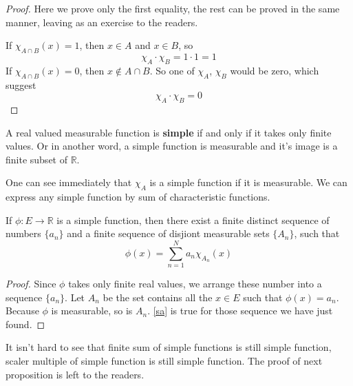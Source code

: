 \documentclass[lang=en, 12pt]{elegantbook}
\newcommand{\RR}{\mathbb{R}}
\begin{document}
                \begin{proof}
                    Here we prove only the first equality, the rest can be proved in the same manner, leaving as an exercise to the readers.\par
                    If $\chi_{A \cap B}(x) = 1$, then $x \in A$ and $x\in B$, so 
                $$\chi_A \cdot \chi_B = 1 \cdot 1 = 1$$
                If $\chi_{A \cap B}(x) = 0$, then $x \notin A \cap B$. So one of $\chi_A$, $\chi_B$ would be zero, which suggest 
                $$\chi_A \cdot \chi_B = 0$$ \par                   
                \end{proof}
                \begin{definition}
                    A real valued measurable function is \textbf{simple} if and only if it takes only finite values.
                Or in another word, a simple function is measurable and it's image is a finite subset of $\RR$.
                \end{definition}
                One can see immediately that $\chi_A$ is a simple function if it is measurable. We can express any simple function by sum 
            of characteristic functions.
                \begin{proposition}
                    If $\phi:E \to \RR$ is a simple function, then there exist a finite distinct sequence of numbers $\{a_n\}$ and a finite sequence of disjiont measurable sets $\{A_n\}$,
                such that 
                    \begin{equation}
                        \phi(x) = \sum_{n=1}^{N} a_n \chi_{A_n}(x) \label{sa}
                    \end{equation} 
                \end{proposition}
                \begin{proof}
                    Since $\phi$ takes only finite real values, we arrange these number into a sequence $\{a_n\}$. 
                Let $A_n$ be the set contains all the $x \in E$ such that $\phi(x) = a_n$. Because $\phi$ is measurable, so is $A_n$.
                \eqref{sa} is true for those sequence we have just found.
                \end{proof}
                It isn't hard to see that finite sum of simple functions is still simple function, scaler multiple of simple function is still simple 
            function. The proof of next proposition is left to the readers.
\end{document}
